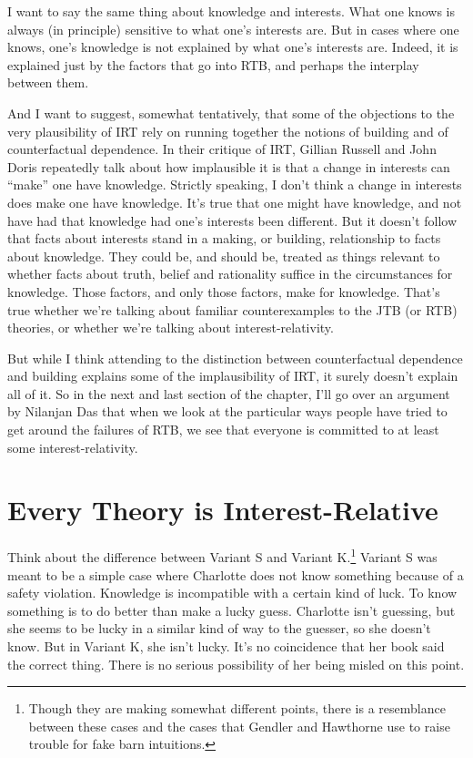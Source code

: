 \documentclass[
  11pt,
]{book}
\begin{document}
I want to say the same thing about knowledge and interests. What one knows is always (in principle) sensitive to what one's interests are. But in cases where one knows, one's knowledge is not explained by what one's interests are. Indeed, it is explained just by the factors that go into RTB, and perhaps the interplay between them.

And I want to suggest, somewhat tentatively, that some of the objections to the very plausibility of IRT rely on running together the notions of building and of counterfactual dependence. In their critique of IRT, Gillian Russell and John Doris \citeyearpar{RussellDoris2008} repeatedly talk about how implausible it is that a change in interests can ``make'' one have knowledge. Strictly speaking, I don't think a change in interests does make one have knowledge. It's true that one might have knowledge, and not have had that knowledge had one's interests been different. But it doesn't follow that facts about interests stand in a making, or building, relationship to facts about knowledge. They could be, and should be, treated as things relevant to whether facts about truth, belief and rationality suffice in the circumstances for knowledge. Those factors, and only those factors, make for knowledge. That's true whether we're talking about familiar counterexamples to the JTB (or RTB) theories, or whether we're talking about interest-relativity.

But while I think attending to the distinction between counterfactual dependence and building explains some of the implausibility of IRT, it surely doesn't explain all of it. So in the next and last section of the chapter, I'll go over an argument by Nilanjan Das that when we look at the particular ways people have tried to get around the failures of RTB, we see that everyone is committed to at least some interest-relativity.

\hypertarget{das}{%
\section{Every Theory is Interest-Relative}\label{das}}

Think about the difference between Variant S and Variant K.\footnote{Though they are making somewhat different points, there is a resemblance between these cases and the cases that Gendler and Hawthorne \citeyearpar{Gendler2005} use to raise trouble for fake barn intuitions.} Variant S was meant to be a simple case where Charlotte does not know something because of a safety violation. Knowledge is incompatible with a certain kind of luck. To know something is to do better than make a lucky guess. Charlotte isn't guessing, but she seems to be lucky in a similar kind of way to the guesser, so she doesn't know. But in Variant K, she isn't lucky. It's no coincidence that her book said the correct thing. There is no serious possibility of her being misled on this point.
\end{document}

